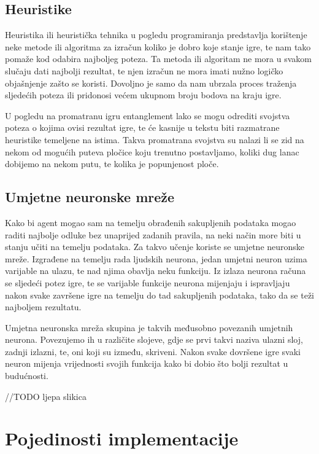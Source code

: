 \documentclass[zavrsnirad]{fer}
\begin{document}
\section{Heuristike}
\label{pog:opis_heuristika}


Heuristika ili heuristička tehnika u pogledu programiranja predstavlja korištenje neke metode ili algoritma za izračun koliko je dobro koje stanje igre, te nam tako pomaže kod odabira najboljeg poteza. Ta metoda ili algoritam ne mora u svakom slučaju dati najbolji rezultat, te njen izračun ne mora imati nužno logičko objašnjenje zašto se koristi. Dovoljno je samo da nam ubrzala proces traženja sljedećih poteza ili pridonosi većem ukupnom broju bodova na kraju igre.

U pogledu na promatranu igru entanglement lako se mogu odrediti svojstva poteza o kojima ovisi rezultat igre, te će kasnije u tekstu biti razmatrane heuristike temeljene na istima. Takva promatrana svojstva su nalazi li se zid na nekom od mogućih puteva pločice koju trenutno postavljamo, koliki dug lanac dobijemo na nekom putu, te kolika je popunjenost ploče. 



\section{Umjetne neuronske mreže}
\label{pog:opis_neuronskih}

Kako bi agent mogao sam na temelju obrađenih sakupljenih podataka mogao raditi najbolje odluke bez unaprijed zadanih pravila, na neki način more biti u stanju učiti na temelju podataka. Za takvo učenje koriste se umjetne neuronske mreže. Izgrađene na temelju rada ljudskih neurona, jedan umjetni neuron uzima varijable na ulazu, te nad njima obavlja neku funkciju. Iz izlaza neurona računa se sljedeći potez igre, te se varijable funkcije neurona mijenjaju i ispravljaju nakon svake završene igre na temelju do tad sakupljenih podataka, tako da se teži najboljem rezultatu. 

Umjetna neuronska mreža skupina je takvih međusobno povezanih umjetnih neurona. Povezujemo ih u različite slojeve, gdje se prvi takvi naziva ulazni sloj, zadnji izlazni, te, oni koji su između, skriveni. Nakon svake dovršene igre svaki neuron mijenja vrijednosti svojih funkcija kako bi dobio što bolji rezultat u budućnosti.

//TODO ljepa slikica


\chapter{Pojedinosti implementacije}
\label{pog:glavni_dio2}
\end{document}
